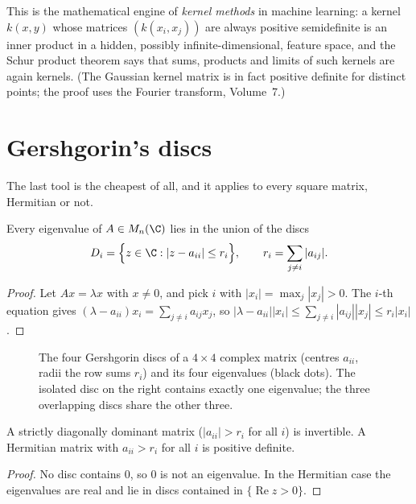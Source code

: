This is the mathematical engine of \emph{kernel methods} in machine learning: a kernel $k(x,y)$ whose matrices $(k(x_i,x_j))$ are
always positive semidefinite is an inner product in a hidden, possibly infinite-dimensional, feature space, and the Schur product
theorem says that sums, products and limits of such kernels are again kernels. (The Gaussian kernel matrix is in fact positive
definite for distinct points; the proof uses the Fourier transform, Volume~7.)

\section{Gershgorin's discs}

The last tool is the cheapest of all, and it applies to every square matrix, Hermitian or not.

\begin{theorem}[Gershgorin, 1931]\label{linear:thm:gershgorin}
Every eigenvalue of $A\in M_n(\C)$ lies in the union of the discs
\[
D_i=\Bigl\{z\in\C:|z-a_{ii}|\le r_i\Bigr\},\qquad r_i=\sum_{j\ne i}|a_{ij}|.
\]
\end{theorem}
\begin{proof}
Let $Ax=\lambda x$ with $x\ne0$, and pick $i$ with $|x_i|=\max_j|x_j|>0$. The $i$-th equation gives $(\lambda-a_{ii})x_i=\sum_{j\ne
i}a_{ij}x_j$, so $|\lambda-a_{ii}||x_i|\le\sum_{j\ne i}|a_{ij}||x_j|\le r_i|x_i|$.
\end{proof}

\begin{figure}[ht]
\centering
{}
\caption{The four Gershgorin discs of a $4\times4$ complex matrix (centres $a_{ii}$, radii the row sums $r_i$) and its four eigenvalues
(black dots). The isolated disc on the right contains exactly one eigenvalue; the three overlapping discs share the other three.}
\label{linear:fig:gershgorin}
\end{figure}

\begin{corollary}\label{linear:cor:diagdom}
A strictly diagonally dominant matrix ($|a_{ii}|>r_i$ for all $i$) is invertible. A Hermitian matrix with $a_{ii}>r_i$ for all $i$ is
positive definite.
\end{corollary}
\begin{proof}
No disc contains $0$, so $0$ is not an eigenvalue. In the Hermitian case the eigenvalues are real and lie in discs contained in
$\{\operatorname{Re}z>0\}$.
\end{proof}


